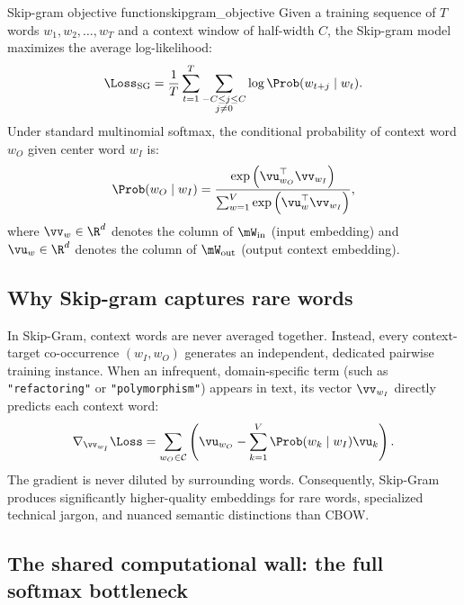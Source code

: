 \documentclass[../../main.tex]{subfiles}
\begin{document}
\begin{definition}{Skip-gram objective function}{skipgram_objective}
Given a training sequence of $T$ words $w_1, w_2, \dots, w_T$ and a context window of half-width $C$, the Skip-gram model maximizes the average log-likelihood:
\begin{equation}
\label{eq:skipgram_loglik}
\Loss_{\text{SG}} = \frac{1}{T} \sum_{t=1}^T \sum_{\substack{-C \le j \le C \\ j \neq 0}} \log \Prob(w_{t+j} \mid w_t).
\end{equation}
Under standard multinomial softmax, the conditional probability of context word $w_O$ given center word $w_I$ is:
\begin{equation}
\label{eq:skipgram_softmax}
\Prob(w_O \mid w_I) = \frac{\exp\left( \vu_{w_O}^\top \vv_{w_I} \right)}{\sum_{w=1}^V \exp\left( \vu_w^\top \vv_{w_I} \right)},
\end{equation}
where $\vv_w \in \R^d$ denotes the column of $\mW_{\text{in}}$ (input embedding) and $\vu_w \in \R^d$ denotes the column of $\mW_{\text{out}}$ (output context embedding).
\end{definition}

\subsection{Why Skip-gram captures rare words}
\label{subsec:skipgram_rare_words}

In Skip-Gram, context words are never averaged together. Instead, every context-target co-occurrence $(w_I, w_O)$ generates an independent, dedicated pairwise training instance. When an infrequent, domain-specific term (such as \texttt{"refactoring"} or \texttt{"polymorphism"}) appears in text, its vector $\vv_{w_I}$ directly predicts each context word:
\begin{equation}
\label{eq:skipgram_pair_grad}
\nabla_{\vv_{w_I}} \Loss = \sum_{w_O \in \mathcal{C}} \left( \vu_{w_O} - \sum_{k=1}^V \Prob(w_k \mid w_I) \vu_k \right).
\end{equation}
The gradient is never diluted by surrounding words. Consequently, Skip-Gram produces significantly higher-quality embeddings for rare words, specialized technical jargon, and nuanced semantic distinctions than CBOW.

\subsection{The shared computational wall: the full softmax bottleneck}
\label{subsec:softmax_bottleneck}
\end{document}
